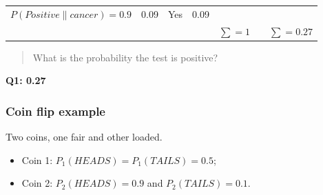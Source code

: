 \documentclass[]{book}
\providecommand{\tightlist}{%
  \setlength{\itemsep}{0pt}\setlength{\parskip}{0pt}}
\begin{document}
\begin{longtable}[]{@{}ccccccc@{}}
\begin{minipage}[t]{0.04\columnwidth}
\(P(Positive\| cancer) = 0.9\)\strut
\end{minipage} & \begin{minipage}[t]{0.04\columnwidth}\centering\strut
0.09\strut
\end{minipage} & \begin{minipage}[t]{0.04\columnwidth}\centering\strut
Yes\strut
\end{minipage} & \begin{minipage}[t]{0.04\columnwidth}\centering\strut
0.09\strut
\end{minipage}\tabularnewline
\begin{minipage}[t]{0.04\columnwidth}\centering\strut
\strut
\end{minipage} & \begin{minipage}[t]{0.04\columnwidth}\centering\strut
\strut
\end{minipage} & \begin{minipage}[t]{0.04\columnwidth}\centering\strut
\strut
\end{minipage} & \begin{minipage}[t]{0.04\columnwidth}\centering\strut
\strut
\end{minipage} & \begin{minipage}[t]{0.04\columnwidth}\centering\strut
\(\sum = 1\)\strut
\end{minipage} & \begin{minipage}[t]{0.04\columnwidth}\centering\strut
\strut
\end{minipage} & \begin{minipage}[t]{0.04\columnwidth}\centering\strut
\(\sum = 0.27\)\strut
\end{minipage}\tabularnewline
\bottomrule
\end{longtable}

\begin{quote}
What is the probability the test is positive?
\end{quote}

\textbf{Q1: 0.27}

\subsubsection{Coin flip example}\label{coin-flip-example-1}

Two coins, one fair and other loaded.

\begin{itemize}
\tightlist
\item
  Coin 1: \(P_1(HEADS) = P_1(TAILS) = 0.5\);
\item
  Coin 2: \(P_2(HEADS) = 0.9\) and \(P_2(TAILS) = 0.1\).
\end{itemize}
\end{document}
